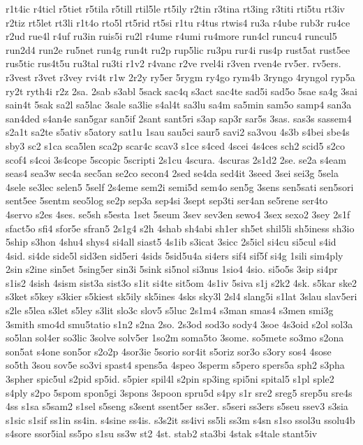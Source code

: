 {r1t4ic
r4ticl
r5tiet
r5tila
r5till
rtil5le
rt5ily
r2tin
r3tina
rt3ing
r3titi
rti5tu
rt3iv
r2tiz
rt5let
rt3li
r1t4o
rto5l
rt5rid
rt5si
r1tu
r4tus
rtwis4
ru3a
r4ube
rub3r
ru4ce
r2ud
rue4l
r4uf
ru3in
ruis5i
ru2l
r4ume
r4umi
ru4more
run4cl
runcu4
runcul5
run2d4
run2e
ru5net
run4g
run4t
ru2p
rup5lic
ru3pu
rur4i
rus4p
rust5at
rust5ee
rus5tic
rus4t5u
ru3tal
ru3ti
r1v2
r4vanc
r2ve
rvel4i
r3ven
rven4e
rv5er.
rv5ers.
r3vest
r3vet
r3vey
rvi4t
r1w
2r2y
ry5er
5rygm
ry4go
rym4b
3ryngo
4ryngol
ryp5a
ry2t
ryth4i
r2z
2sa.
2sab
s3abl
5sack
sac4q
s3act
sac4te
sad5i
sad5o
5sae
sa4g
3sai
sain4t
5sak
sa2l
sa5lac
3sale
sa3lie
s4al4t
sa3lu
sa4m
sa5min
sam5o
samp4
san3a
san4ded
s4an4e
san5gar
san5if
2sant
sant5ri
s3ap
sap3r
sar5s
3sas.
sas3s
sassem4
s2a1t
sa2te
s5ativ
s5atory
sat1u
1sau
sau5ci
saur5
savi2
sa3vou
4s3b
s4bei
sbe4s
sby3
sc2
s1ca
sca5len
sca2p
scar4c
scav3
s1ce
s4ced
4scei
4s4ces
sch2
scid5
s2co
scof4
s4coi
3s4cope
5scopic
5scripti
2s1cu
4scura.
4scuras
2s1d2
2se.
se2a
s4eam
seas4
sea3w
sec4a
sec5an
se2co
secon4
2sed
se4da
sed4it
3seed
3sei
sei3g
5sela
4sele
se3lec
selen5
5self
2s4eme
sem2i
semi5d
sem4o
sen5g
3sens
sen5sati
sen5sori
sent5ee
5sentm
seo5log
se2p
sep3a
sep4si
3sept
sep3ti
ser4an
se5rene
ser4to
4servo
s2es
4ses.
se5sh
s5esta
1set
5seum
3sev
sev3en
sewo4
3sex
sexo2
3sey
2s1f
sfact5o
sfi4
sfor5e
sfran5
2s1g4
s2h
4shab
sh4abi
sh1er
sh5et
shil5li
sh5iness
sh3io
5ship
s3hon
4shu4
shys4
si4all
siast5
4s1ib
s3icat
3sicc
2s5icl
si4cu
si5cul
s4id
4sid.
si4de
side5l
sid3en
sid5eri
4sids
5sid5u4a
si4ers
sif4
sif5f
si4g
1sili
sim4ply
2sin
s2ine
sin5et
5sing5er
sin3i
5sink
si5nol
si3nus
1sio4
4sio.
si5o5s
3sip
si4pr
s1is2
4sish
4sism
sist3a
sist3o
s1it
si4te
sit5om
4s1iv
5siva
s1j
s2k2
4sk.
s5kar
ske2
s3ket
s5key
s3kier
s5kiest
sk5ily
sk5ines
4sks
sky3l
2sl4
slang5i
s1lat
3slau
slav5eri
s2le
s5lea
s3let
s5ley
s3lit
slo3c
slov5
s5luc
2s1m4
s3man
smas4
s3men
smi3g
3smith
smo4d
smu5tatio
s1n2
s2na
2so.
2s3od
sod3o
sody4
3soe
4s3oid
s2ol
sol3a
so5lan
sol4er
so3lic
3solve
solv5er
1so2m
soma5to
3some.
so5mete
so3mo
s2ona
son5at
s4one
son5or
s2o2p
4sor3ie
5sorio
sor4it
s5oriz
sor3o
s3ory
sos4
4sose
so5th
3sou
sov5e
so3vi
spast4
spens5a
4speo
3sperm
s5pero
spers5a
sph2
s3pha
3spher
spic5ul
s2pid
sp5id.
s5pier
spil4l
s2pin
sp3ing
spi5ni
spital5
s1pl
sple2
s4ply
s2po
5spom
spon5gi
3spons
3spoon
spru5d
s4py
s1r
sre2
sreg5
srep5u
sre4s
4ss
s1sa
s5sam2
s1sel
s5seng
s3sent
ssent5er
ss3er.
s5seri
ss3ers
s5seu
ssev3
s3sia
s1sic
s1sif
ss1in
ss4in.
s4sine
ss4is.
s3s2it
ss4ivi
ss5li
ss3m
s4sn
s1so
ssol3u
ssolu4b
s4sore
ssor5ial
ss5po
s1su
ss3w
st2
4st.
stab2
sta3bi
4stak
s4tale
stant5iv
}

